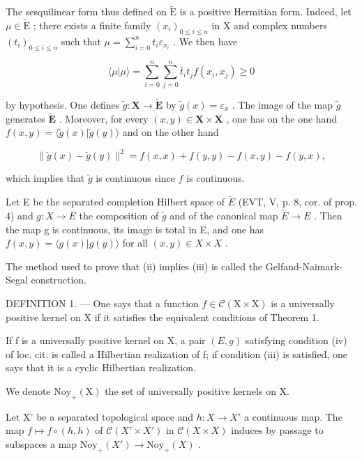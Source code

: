 The sesquilinear form thus defined on \(\widetilde{\mathrm{E}}\) is a positive Hermitian form. Indeed, let \(\mu \in \widetilde{\mathrm{E}}\) ; there exists a finite family \((x_{i})_{0\leqslant i\leqslant n}\) in X and complex numbers \((t_i)_{0\leqslant i\leqslant n}\) such that \(\mu = \sum_{i=0}^{n} t_i \varepsilon_{x_i}\) . We then have

\[
\langle \mu | \mu \rangle = \sum_ {i = 0} ^ {n} \sum_ {j = 0} ^ {n} \bar {t} _ {i} t _ {j} f (x _ {i}, x _ {j}) \geqslant 0
\]

by hypothesis. One defines \(\widetilde{g}\colon\mathbf{X}\to\widetilde{\mathbf{E}}\) by \(\widetilde{g}(x)=\varepsilon_{x}\) . The image of the map \(\widetilde{g}\) generates \(\widetilde{\mathbf{E}}\) . Moreover, for every \((x,y)\in\mathbf{X}\times\mathbf{X}\) , one has on the one hand \(f(x,y)=\langle\widetilde{g}(x)|\widetilde{g}(y)\rangle\) and on the other hand

\[
\| \widetilde {g} (x) - \widetilde {g} (y) \| ^ {2} = f (x, x) + f (y, y) - f (x, y) - f (y, x),
\]

which implies that \(\widetilde{g}\) is continuous since \(f\) is continuous.

Let E be the separated completion Hilbert space of \(\widetilde{E}\) (EVT, V, p. 8, cor. of prop. 4) and \(g\colon X \to E\) the composition of \(\widetilde{g}\) and of the canonical map \(\widetilde{E} \to E\) . Then the map g is continuous, its image is total in E, and one has \(f(x,y) = \langle g(x) | g(y) \rangle\) for all \((x,y) \in X \times X\) .

The method used to prove that (ii) implies (iii) is called the Gelfand-Naimark-Segal construction.

DEFINITION 1. --- One says that a function \(f \in \mathcal{C}(\mathrm{X} \times \mathrm{X})\) is a universally positive kernel on X if it satisfies the equivalent conditions of Theorem 1.

If f is a universally positive kernel on X, a pair \((E,g)\) satisfying condition (iv) of loc. cit. is called a Hilbertian realization of f; if condition (iii) is satisfied, one says that it is a cyclic Hilbertian realization.

We denote \(\mathrm{Noy}_{+}(\mathrm{X})\) the set of universally positive kernels on X.

Let X' be a separated topological space and \(h: X \to X'\) a continuous map. The map \(f \mapsto f \circ (h, h)\) of \(\mathcal{C}(X' \times X')\) in \(\mathcal{C}(X \times X)\) induces by passage to subspaces a map \(\mathrm{Noy}_{+}(X') \to \mathrm{Noy}_{+}(X)\) .

